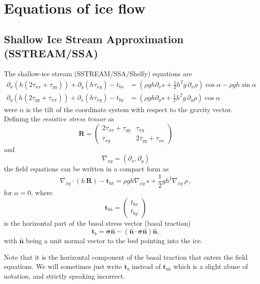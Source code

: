 \documentclass[10pt,a4paper]{book}
\newcommand{\p}{\partial}
\newcommand{\tbx}{t_{bx}}
\newcommand{\tby}{t_{by}}
\newcommand{\txx}{\tau_{xx}}
\newcommand{\tyy}{\tau_{yy}}
\newcommand{\txy}{\tau_{xy}}
\newcommand{\normal}{\hat{\bm{n}}}
\begin{document}
\chapter{Equations of ice flow}



\section{Shallow Ice Stream Approximation (SSTREAM/SSA)}

The shallow-ice stream (SSTREAM/SSA/Shelfy) equations are
\begin{align} 
\p_x ( h ( 2 \txx + \tyy)) +\p_y ( h \txy) - \tbx
&=(\rho g h \p_x s +\frac{1}{2} h^2 g  \, \p_x \rho ) \cos \alpha-\rho g h \sin \alpha
\label{eq:stressx}\\
\p_y (  h ( 2 \tyy + \txx)) +\p_x ( h \txy ) - \tby
&=(\rho g h \p_y s  +\frac{1}{2} h^2 g \, \p_y \rho ) \cos \alpha
\label{eq:stressy}
\end{align}
were $\alpha$ is the tilt of the coordinate system with respect to the
gravity vector. Defining the {\em resistive stress tensor} as
\begin{equation}
\bm{R}=\begin{pmatrix} 2 \txx+\tyy & \txy \\ \txy & 2 \tyy + \txx \end{pmatrix}
\label{eq:defSigmah}
\end{equation}
and
\[
\nabla_{xy} = (\p_x , \p_y)
\]
the field equations can be written in a compact form as
\begin{equation}
\nabla_{xy} \cdot (h \, \bm{R}) - \bm{t}_{bh} = \rho g h \nabla_{xy}  \, s  + \frac{1}{2} g h^2 \nabla_{xy} \, \rho \, ,
\label{eq:FEao}
\end{equation}
for $\alpha=0$, where
\[
\bm{t}_{bh}= \left ( \begin{array}{c} \tbx \\ \tby \end{array} \right )
\]
is the horizontal part of the basal stress vector (basal traction) 
\[
\bm{t}_b=\bm{\sigma}
\normal-(\normal \cdot \bm{\sigma} \normal) \normal ,\] 
with $\normal$ being a unit normal vector to the bed pointing into the
ice.

Note that it is the horizontal component of the basal traction that
enters the field equations. We will sometimes just write $\bm{t}_b$
instead of $\bm{t}_{bh}$ which is a slight abuse of notation, and
strictly speaking incorrect. 
\end{document}
